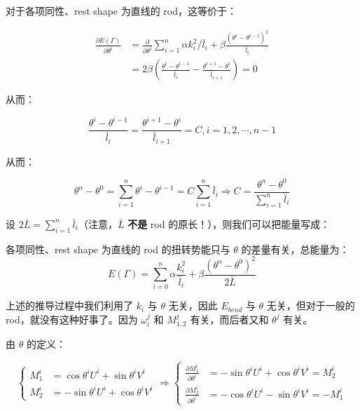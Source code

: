 \documentclass{notes}
\begin{document}
对于各项同性、rest shape 为直线的 rod，这等价于：

$$
	\begin{aligned}
	\frac{\partial E(\Gamma)}{\partial \theta^i} &= \frac{\partial }{\partial \theta^i} \sum\limits_{i = 1}^{n}\alpha k_i^2 / \bar{l}_i + \beta \frac{(\theta^i - \theta^{i - 1})^2}{\bar{l}_i} \\
	&= 2\beta\left(\frac{\theta^i - \theta^{i - 1}}{\bar{l}_i} - \frac{\theta^{i + 1} - \theta^i}{\bar{l}_{i + 1}}  \right) = 0
	\end{aligned}
$$

从而：

\begin{equation}
	\frac{\theta^i - \theta^{i - 1}}{\bar{l}_i} = \frac{\theta^{i + 1} - \theta^i}{\bar{l}_{i + 1}} = C, i = 1, 2, \cdots, n - 1
\end{equation}

从而：

$$\theta^n - \theta^0 = \sum\limits_{i = 1}^{n} \theta^i - \theta^{i - 1} = C \sum\limits_{i = 1}^{n} \bar{l}_i \Rightarrow C = \frac{\theta^n - \theta^0}{\sum\limits_{i = 1}^{n}\bar{l}_i}$$

设 $2 \overline{L} = \sum\limits_{i = 1}^{n} \bar{l}_i$（注意，$\bar{L}$ \textbf{不是} rod 的原长！），则我们可以把能量写成：

\begin{theorem}
	各项同性、rest shape 为直线的 rod 的扭转势能只与 $\theta$ 的差量有关，总能量为：
	\begin{equation}\label{eq:distwist}
		E(\Gamma) = \sum\limits_{i = 0}^{n}\alpha \frac{k_i^2}{\bar{l}_i} + \beta \frac{\left(\theta^n - \theta^0\right)^2}{2 \bar{L}}  
	\end{equation}
\end{theorem}

上述的推导过程中我们利用了 $k_i$ 与 $\theta$ 无关，因此 $E_{bend}$ 与 $\theta$ 无关，但对于一般的 rod，就没有这种好事了。因为 $\omega_i^j$ 和 $M^j_{1,2}$ 有关，而后者又和 $\theta^j$ 有关。

由 $\theta$ 的定义：

$$
	\left\{\begin{aligned}
		M_1^i &= \cos \theta^i U^i + \sin \theta^i V^i \\
		M_2^i &= - \sin \theta^i U^i + \cos \theta^i V^i
	\end{aligned}\right.
	\Rightarrow
	\left\{\begin{aligned}
		\frac{\partial M_1^i}{\partial \theta^i} &= - \sin \theta^i U^i + \cos \theta^i V^i = M_2^i\\
		\frac{\partial M_2^i}{\partial \theta^i} &= - \cos \theta^i U^i - \sin \theta^i V^i = - M_1^i
	\end{aligned}\right.
$$
\end{document}
